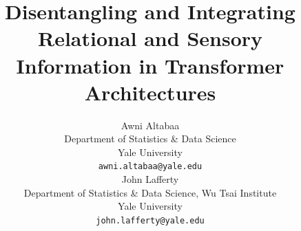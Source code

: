 \documentclass{article}
\title{Disentangling and Integrating Relational and Sensory \\Information in Transformer Architectures}
\author{%
  Awni Altabaa\\ %
  Department of Statistics \& Data Science\\
  Yale University\\
  \texttt{awni.altabaa@yale.edu} \\
  \AND
  John Lafferty \\
  Department of Statistics \& Data Science, Wu Tsai Institute \\
  Yale University \\
  \texttt{john.lafferty@yale.edu}
}
\begin{document}
\maketitle








% 











% 

\printbibliography


\listoffixmes

\clearpage
\newpage


\appendix









% 
\end{document}
